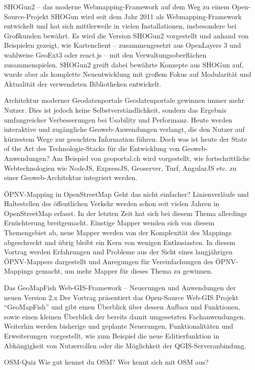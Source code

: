 %
{SHOGun2 – das moderne Webmapping-Framework}%
{auf dem Weg zu einem Open-Source-Projekt}%
{SHOGun wird seit dem Jahr 2011 als Webmapping-Framework entwickelt und hat sich mittlerweile in
  vielen Installationen, insbesondere bei Großkunden bewährt.  Es wird die Version SHOGun2
  vorgestellt und anhand von Beispielen gezeigt, wie Kartenclient --
zusammengesetzt aus OpenLayers 3 und wahlweise GeoExt3 oder react.js -- mit den
Verwaltungsoberflächen zusammenspielen.  SHOGun2 greift dabei bewährte Konzepte aus SHOGun auf,
wurde aber als komplette Neuentwicklung mit großem Fokus auf Modularität und Aktualität der
verwendeten Bibliotheken entwickelt.}


%
{Architektur moderner Geodatenportale}%
{}%
{Geodatenportale gewinnen immer mehr Nutzer. Dies ist jedoch keine Selbstverständlichkeit, sondern
das Ergebnis umfangreicher Verbesserungen bei Usability und Performanz. Heute werden interaktive und
zugängliche Geoweb-Anwendungen verlangt, die den Nutzer auf kürzestem Wege zur gesuchten Information
führen. Doch was ist heute der State of the Art des Technologie-Stacks für die Entwicklung von
Geoweb-Anwendungen? Am Beispiel von geoportal.ch wird vorgestellt, wie fortschrittliche
Webtechnologien wie NodeJS, ExpressJS, Geoserver, Turf, AngularJS etc. zu einer Geoweb-Architektur
integriert werden.}

%
{ÖPNV-Mapping in OpenStreetMap}%
{Geht das nicht einfacher?}%
{Linienverläufe und Haltestellen des öffentlichen Verkehr werden schon seit vielen Jahren in
OpenStreetMap erfasst. In der letzten Zeit hat sich bei diesem Thema allerdings Ernüchterung
breitgemacht. Einstige Mapper wenden sich von diesem Themengebiet ab, neue Mapper werden von der
Komplexität des Mappings abgeschreckt und übrig bleibt ein Kern von wenigen Enthusiasten. In diesem
Vortrag werden Erfahrungen und Probleme aus der Sicht eines langjährigen ÖPNV-Mappers dargestellt
und Anregungen für Vereinfachungen des ÖPNV-Mappings gemacht, um mehr Mapper für dieses Thema zu
gewinnen.}

%
{Das GeoMapFish Web-GIS-Framework – Neuerungen und Anwendungen der neuen Version 2.x}%
{}%
{Der Vortrag präsentiert das Open-Source Web-GIS Projekt “GeoMapFish” und gibt einen Überblick über
dessen Aufbau und Funktionen, sowie einen kleinen Überblick der bereits damit umgesetzten
Fachanwendungen. Weiterhin werden bisherige und geplante Neuerungen, Funktionalitäten und
Erweiterungen vorgestellt, wie zum Beispiel die neue Editierfunktion in Abhängigkeit von
Nutzerrollen oder die Möglichkeit der QGIS-Serveranbindung.}


%
{OSM-Quiz}%
{Wie gut kennst du OSM?}%
{Wer kennt sich mit OSM aus?}

